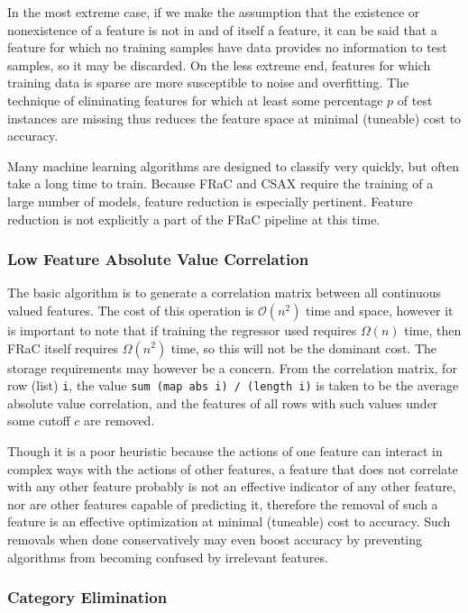 \documentclass{article}
\newcommand{\bigO}{\mathcal{O}}
\begin{document}
\begin{multicols}{2}
In the most extreme case, if we make the assumption that the existence or nonexistence of a feature is not in and of itself a feature, it can be said that a feature for which no training samples have data provides no information to test samples, so it may be discarded.  On the less extreme end, features for which training data is sparse are more susceptible to noise and overfitting.  The technique of eliminating features for which at least some percentage $p$ of test instances are missing thus reduces the feature space at minimal (tuneable) cost to accuracy.

Many machine learning algorithms are designed to classify very quickly, but often take a long time to train.  Because FRaC and CSAX require the training of a large number of models, feature reduction is especially pertinent.  Feature reduction is not explicitly a part of the FRaC pipeline at this time.

\subsubsection{Low Feature Absolute Value Correlation}

\label{sec:cormat}

The basic algorithm is to generate a correlation matrix between all continuous valued features.  The cost of this operation is $\bigO(n^2)$ time and space, however it is important to note that if training the regressor used requires $\Omega(n)$ time, then FRaC itself requires $\Omega(n^2)$ time, so this will not be the dominant cost.  The storage requirements may however be a concern.  From the correlation matrix, for row (list) \texttt{i}, the value \texttt{sum (map abs i) / (length i)} is taken to be the average absolute value correlation, and the features of all rows with such values under some cutoff $c$ are removed.

Though it is a poor heuristic because the actions of one feature can interact in complex ways with the actions of other features, a feature that does not correlate with any other feature probably is not an effective indicator of any other feature, nor are other features capable of predicting it, therefore the removal of such a feature is an effective optimization at minimal (tuneable) cost to accuracy.  Such removals when done conservatively may even boost accuracy by preventing algorithms from becoming confused by irrelevant features.

\subsubsection{Category Elimination}


\end{multicols}
\end{document}
